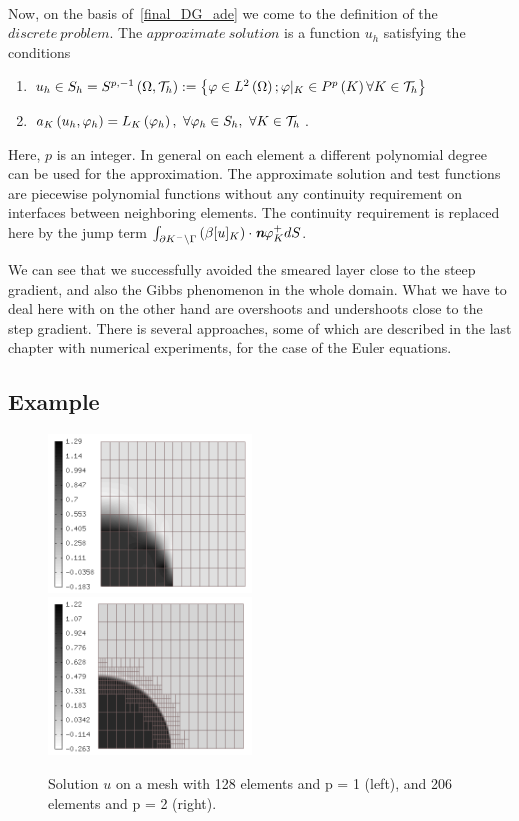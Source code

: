 \paragraph{}
Now, on the basis of~\eqref{final_DG_ade} we come to the definition of the $discrete\ problem$. The $approximate\ solution$ is a function $u_h$ satisfying the conditions
\begin{enumerate}
\item $u_h\in S_h = S^{p, -1}\left(\Omega,\mathcal{T}_h\right):=\left\{\varphi\in L^2\left(\Omega\right);\varphi|_K\in P^p\left( K\right)\forall K \in \mathcal{T}_h\right\}$
\item $a_K\left( u_h, \varphi_h\right) = L_K\left(\varphi_h\right),\ \forall\varphi_h\in S_h,\ \forall K\in\mathcal{T}_h$.
\end{enumerate}
Here, $p$ is an integer. In general on each element a different polynomial degree can be used for the approximation. The approximate solution and test functions are piecewise polynomial functions without any continuity requirement on interfaces between neighboring elements. The continuity requirement is replaced here by the jump term $\int_{\partial K^-\backslash\Gamma}\left(\beta [u]_K\right)\cdot\textit{\textbf{n}}\varphi_K^+ dS$.

We can see that we successfully avoided the smeared layer close to the steep gradient, and also the Gibbs phenomenon in the whole domain. What we have to deal here with on the other hand are overshoots and undershoots close to the step gradient. There is several approaches, some of which are described in the last chapter with numerical experiments, for the case of the Euler equations.
\subsection{Example}
\begin{figure}[H]
\begin{center}
\includegraphics[width=0.48\textwidth]{minor_examples/DG00.png}\ \ \ 
\includegraphics[width=0.48\textwidth]{minor_examples/DG01.png}
\end{center}
\vspace{-4mm}
\caption{Solution $u$ on a mesh with 128 elements and p = 1 (left), and 206 elements and p = 2 (right).}
\end{figure}

